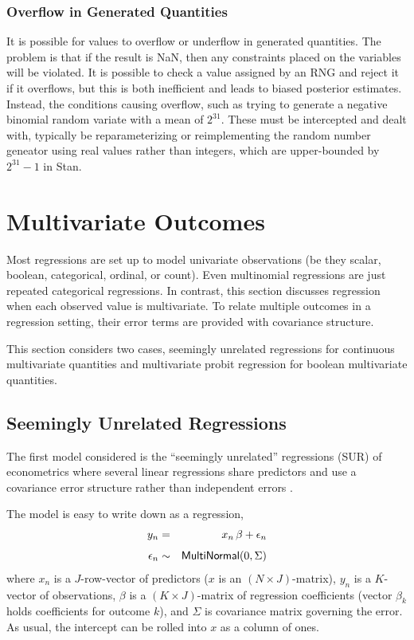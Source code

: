 \subsubsection{Overflow in Generated Quantities}

It is possible for values to overflow or underflow in generated
quantities.  The problem is that if the result is NaN, then any
constraints placed on the variables will be violated.  It is possible
to check a value assigned by an RNG and reject it if it overflows, but
this is both inefficient and leads to biased posterior estimates.
Instead, the conditions causing overflow, such as trying to generate a
negative binomial random variate with a mean of $2^{31}$.  These must
be intercepted and dealt with, typically be reparameterizing or
reimplementing the random number geneator using real values rather
than integers, which are upper-bounded by $2^{31} - 1$ in Stan.
  

\section{Multivariate Outcomes}

Most regressions are set up to model univariate observations (be they
scalar, boolean, categorical, ordinal, or count).  Even multinomial
regressions are just repeated categorical regressions.  In contrast,
this section discusses regression when each observed value is
multivariate.  To relate multiple outcomes in a regression setting,
their error terms are provided with covariance structure.  

This section considers two cases, seemingly unrelated regressions for
continuous multivariate quantities and multivariate probit regression
for boolean multivariate quantities.

\subsection{Seemingly Unrelated Regressions} 

The first model considered is the ``seemingly unrelated'' regressions
(SUR) of econometrics where several linear regressions share
predictors and use a covariance error structure rather than
independent errors \citep{Zellner:1962,Greene:2011}.

The model is easy to write down as a regression,
%
\begin{eqnarray*}
 y_n & = & x_n \, \beta + \epsilon_n
\\[4pt]
 \epsilon_n & \sim & \distro{MultiNormal}(0, \Sigma)
\end{eqnarray*}
%
where $x_n$ is a $J$-row-vector of predictors ($x$ is an $(N \times
J)$-matrix), $y_n$ is a $K$-vector of observations, $\beta$ is a $(K
\times J)$-matrix of regression coefficients (vector $\beta_k$ holds
coefficients for outcome $k$), and $\Sigma$ is covariance matrix
governing the error.  As usual, the intercept can be rolled into $x$
as a column of ones.

